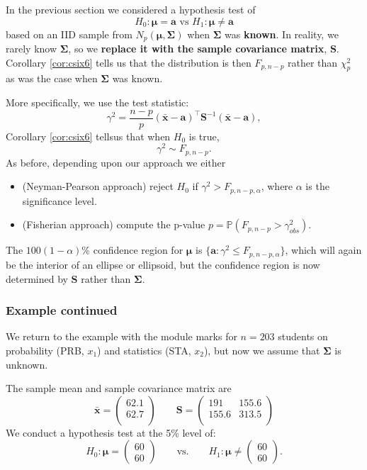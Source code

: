 \documentclass[]{book}
\theoremstyle{definition}
\theoremstyle{definition}
\theoremstyle{definition}
\theoremstyle{remark}
\begin{document}
In the previous section we considered a hypothesis test of
\[H_0: {\boldsymbol{\mu}}= \mathbf a\mbox{ vs } H_1: {\boldsymbol{\mu}}\neq \mathbf a\] based on an IID sample from \(N_p({\boldsymbol{\mu}},\boldsymbol{\Sigma})\) when \(\boldsymbol{\Sigma}\) was \textbf{known}. In reality, we rarely know \(\boldsymbol{\Sigma}\), so we \textbf{replace it with the sample covariance matrix}, \(\mathbf S\). Corollary \ref{cor:csix6} tells us that the distribution is then \(F_{p,n-p}\) rather than \(\chi^2_p\) as was the case when \(\boldsymbol{\Sigma}\) was known.

More specifically, we use the test statistic:
\[\gamma^2 = \frac{n-p}{p} (\bar{\mathbf x}-\mathbf a)^\top \mathbf S^{-1} (\bar{\mathbf x}-\mathbf a),\]
Corollary \ref{cor:csix6} tellsus that when \(H_0\) is true,
\[\gamma^2 \sim F_{p,n-p}.\]
As before, depending upon our approach we either

\begin{itemize}
\item
  (Neyman-Pearson approach) reject \(H_0\) if \(\gamma^2 > F_{p,n-p,\alpha}\), where \(\alpha\) is the significance level.
\item
  (Fisherian approach) compute the p-value \(p = \mathbb{P}(F_{p,n-p} > \gamma^2_{obs})\).
\end{itemize}

The \(100(1-\alpha)\)\% confidence region for \({\boldsymbol{\mu}}\) is \(\{ \mathbf a: \gamma^2 \leq F_{p,n-p,\alpha} \}\), which will again be the interior of an ellipse or ellipsoid, but the confidence region is now determined by \(\mathbf S\) rather than \(\boldsymbol{\Sigma}\).

\hypertarget{example-continued-1}{%
\subsubsection*{Example continued}\label{example-continued-1}}

We return to the example with the module marks for \(n=203\) students on probability (PRB, \(x_1\)) and statistics (STA, \(x_2\)), but now we assume that \(\boldsymbol{\Sigma}\) is unknown.

The sample mean and sample covariance matrix are
\[\bar{\mathbf x} = \begin{pmatrix}62.1 \\62.7 \\\end{pmatrix} \qquad \mathbf S= \begin{pmatrix}191&155.6 \\155.6&313.5 \\\end{pmatrix}\]
We conduct a hypothesis test at the 5\% level of:
\[H_0: {\boldsymbol{\mu}}= \begin{pmatrix} 60 \\ 60 \end{pmatrix} \qquad \text{vs.} \qquad H_1: {\boldsymbol{\mu}}\neq \begin{pmatrix} 60 \\ 60 \end{pmatrix}.\]
\end{document}
